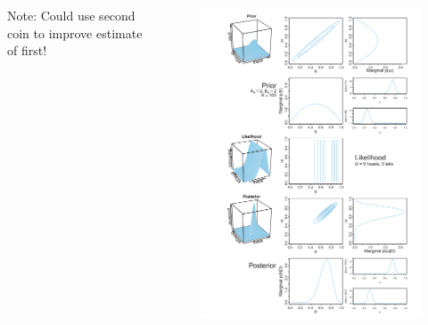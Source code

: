 \documentclass[usenames,dvipsnames,table]{beamer}
\begin{document}
\begin{frame}
\begin{columns}[c]
\vspace{1em}
Note: Could use second coin to improve estimate of first!
\begin{figure}
\centering
\includegraphics[height=0.8\textheight]{img/fig9_2}
\end{figure}
\end{columns}
\end{frame}
\end{document}
